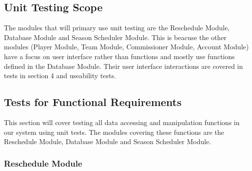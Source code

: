 \documentclass[12pt, titlepage]{article}
\begin{document}
\subsection{Unit Testing Scope}


The modules that will primary use unit testing are the Reschedule Module,
Database Module and Season Scheduler Module. This is beacuse the other modules
(Player Module, Team Module, Commissioner Module, Account Module) have a focus
on user interface rather than functions and mostly use functions defined in
the Database Module. Their user interface interactions are covered in tests in
section 4 and useability tests.

\subsection{Tests for Functional Requirements}


This section will cover testing all data accessing and manipulation functions
in our system using unit tests. The modules covering these functions are the
Reschedule Module, Database Module and Season Scheduler Module.

\subsubsection{Reschedule Module}

\end{document}
